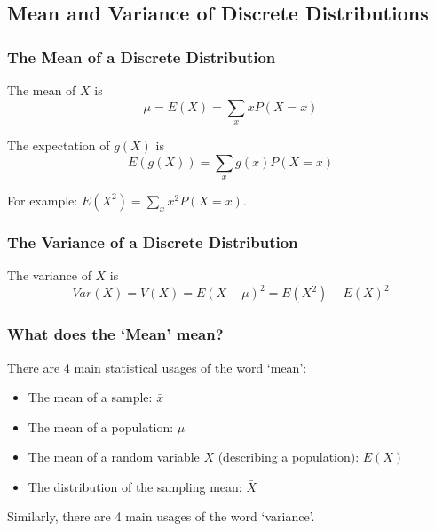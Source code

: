\documentclass[t,xcolor=pdftex,dvipsnames,table]{beamer}
\begin{document}
\subsection{Mean and Variance of Discrete Distributions}
\begin{frame}\frametitle{The Mean of a Discrete Distribution}

\begin{definition}
The mean of $X$ is 
\[ \mu = E(X) = \sum_{x} x P(X=x)  \]

\end{definition}

\begin{definition}

The expectation of $g(X)$ is 
\[ E(g(X)) = \sum_{x} g(x) P(X=x)  \]

For example: $E(X^2) = \sum_{x} x^2 P(X=x) $.

\end{definition}

\end{frame}

\begin{frame}\frametitle{The Variance of a Discrete Distribution}
\begin{definition}[Variance]

The variance of $X$ is 
\[ Var(X) = V(X) =  E(X - \mu)^2 = E(X^2) - E(X)^2  \]
\end{definition}

\end{frame}


\begin{frame}\frametitle{What does the `Mean' mean?}

There are 4 main statistical usages of the word `mean':
\begin{itemize}
\item 
The mean of a sample: $\bar{x}$
\item
The mean of a population: $\mu$
\item
The mean of a random variable $X$ (describing a population): $E(X)$
\item
The distribution of the sampling mean: $\bar{X}$
\end{itemize}

\vspace{.5cm}
Similarly, there are 4 main usages of the word `variance'.

\end{frame}
\end{document}
